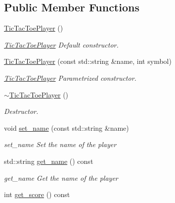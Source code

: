 \subsection*{Public Member Functions}
\begin{DoxyCompactItemize}
\item 
\mbox{\label{class_tic_tac_toe_player_a72a0abd8463de646675b1b7f585c9170}} 
\hyperlink{class_tic_tac_toe_player_a72a0abd8463de646675b1b7f585c9170}{Tic\+Tac\+Toe\+Player} ()
\begin{DoxyCompactList}\small\item\em \hyperlink{class_tic_tac_toe_player}{Tic\+Tac\+Toe\+Player} Default constructor. \end{DoxyCompactList}\item 
\hyperlink{class_tic_tac_toe_player_a6ed50322b8f71dfb0f6ce067d33ff376}{Tic\+Tac\+Toe\+Player} (const std\+::string \&name, int symbol)
\begin{DoxyCompactList}\small\item\em \hyperlink{class_tic_tac_toe_player}{Tic\+Tac\+Toe\+Player} Parametrized constructor. \end{DoxyCompactList}\item 
\mbox{\label{class_tic_tac_toe_player_a3ba5ea5d34cd49ca04b3929e9785d394}} 
\hyperlink{class_tic_tac_toe_player_a3ba5ea5d34cd49ca04b3929e9785d394}{$\sim$\+Tic\+Tac\+Toe\+Player} ()
\begin{DoxyCompactList}\small\item\em Destructor. \end{DoxyCompactList}\item 
void \hyperlink{class_tic_tac_toe_player_a0f2c55f9e76fa53cf723735253dfc43e}{set\+\_\+name} (const std\+::string \&name)
\begin{DoxyCompactList}\small\item\em set\+\_\+name Set the name of the player \end{DoxyCompactList}\item 
std\+::string \hyperlink{class_tic_tac_toe_player_ace0eccd41811e4345ed6bccdb623e6e7}{get\+\_\+name} () const
\begin{DoxyCompactList}\small\item\em get\+\_\+name Get the name of the player \end{DoxyCompactList}\item 
int \hyperlink{class_tic_tac_toe_player_ad0f195090b263ae0ec24019edfeb9f3d}{get\+\_\+score} () const

\end{DoxyCompactItemize}
